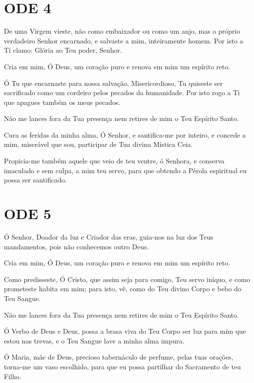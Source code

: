 \documentclass{subfiles}
\begin{document}
\section*{ODE 4}

\eirmos{}De uma Virgem vieste, não como embaixador ou como um anjo, mas o próprio
verdadeiro Senhor encarnado, e salvaste a mim, inteiramente homem. Por isto a Ti
clamo: Glória ao Teu poder, Senhor.

Cria em mim, Ó Deus, um coração puro e renova em mim um espírito reto.

Ó Tu que encarnaste para nossa salvação, Misericordioso, Tu quiseste ser
sacrificado como um cordeiro pelos pecados da humanidade. Por isto rogo a Ti que
apagues também os meus pecados.

Não me lances fora da Tua presença nem retires de mim o Teu Espírito Santo.

Cura as feridas da minha alma, Ó Senhor, e santifica-me por inteiro, e concede a
mim, miserável que sou, participar de Tua divina Mística Ceia.

\Doxology{}

Propicia-me também aquele que veio de teu ventre, ó Senhora, e conserva
imaculado e sem culpa, a mim teu servo, para que obtendo a Pérola espiritual eu
possa ser santificado.

\section*{ODE 5}

\eirmos{}Ó Senhor, Doador da luz e Criador das eras, guia-nos na luz dos Teus
mandamentos, pois não conhecemos outro Deus.

Cria em mim, Ó Deus, um coração puro e renova em mim um espírito reto.

Como predisseste, Ó Cristo, que assim seja para comigo, Teu servo
iníquo, e como prometeste habita em mim; para isto, vê, como do Teu divino
Corpo e bebo do Teu Sangue.

Não me lances fora da Tua presença nem retires de mim o Teu Espírito Santo.

Ó Verbo de Deus e Deus, possa a brasa viva do Teu Corpo ser luz para
mim que estou nas trevas, e o Teu Sangue lave a minha alma impura.

\Doxology{}

Ó Maria, mãe de Deus, precioso tabernáculo de perfume, pelas tuas
orações, torna-me um vaso escolhido, para que eu possa partilhar do
Sacramento de teu Filho.
\end{document}
